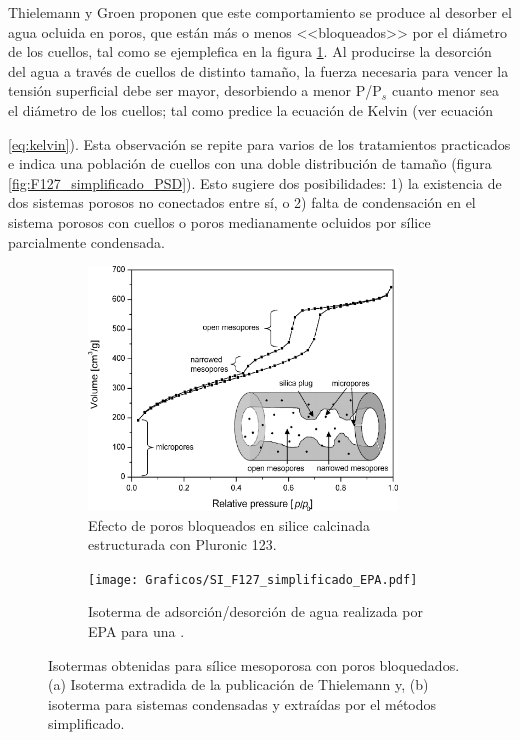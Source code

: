 			Thielemann \cite{Thielemann2011} y Groen\cite{Groen2003} proponen que este comportamiento se produce al desorber el agua ocluida en poros, que están más o menos <<bloqueados>> por el diámetro de los cuellos, tal como se ejemplefica en la figura \ref{fig:thielemann}. Al producirse la desorción del agua a través de cuellos de distinto tamaño, la fuerza  necesaria para vencer la tensión superficial debe ser mayor, desorbiendo a menor P/P$_s$ cuanto menor sea el diámetro de los cuellos; tal como predice la ecuación de Kelvin (ver ecuación {\ref{eq:kelvin}). Esta observación se repite para varios de los tratamientos practicados e indica una población de cuellos con una doble distribución de tamaño (figura \ref{fig:F127_simplificado_PSD}). Esto sugiere dos posibilidades: 1) la existencia de dos sistemas porosos no conectados entre sí, o 2) falta de condensación en el sistema porosos con cuellos o poros medianamente ocluidos por sílice parcialmente condensada.

			\begin{figure}[th]
		 	   	    \begin{subfigure}[t]{0.49\textwidth}
			       	\includegraphics[width=0.90\textwidth]{Graficos/Doble-distr.png}
			       	\caption{Efecto de poros bloqueados en silice calcinada estructurada con Pluronic 123.}
			       	\label{fig:thielemann}
			   		\end{subfigure}
			   		\begin{subfigure}[t]{0.49\textwidth}
			   	    \texttt{[image: Graficos/SI\_F127\_simplificado\_EPA.pdf]}
			   	    \caption{Isoterma de adsorción/desorción de agua realizada por EPA para una \pdmF.}
			   		\end{subfigure}
					 \caption[Microscopías \pdmF\space tratamiento simplificado.]{Isotermas obtenidas para sílice mesoporosa con poros bloquedados. (a) Isoterma extradida de la publicación de Thielemann\cite{Thielemann2011} y, (b) isoterma para sistemas \pdmF\space condensadas y extraídas por el métodos simplificado.}
					 \label{fig:F127_simplificado_EPA_2}	
				     \end{figure}

}

